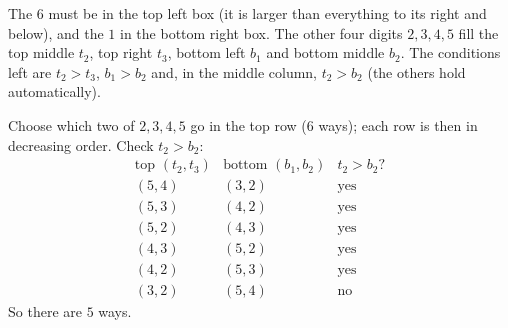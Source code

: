 The $6$ must be in the top left box (it is larger than everything to its right and below), and the $1$ in the bottom right box. The other four digits $2,3,4,5$ fill the top middle $t_2$, top right $t_3$, bottom left $b_1$ and bottom middle $b_2$. The conditions left are $t_2>t_3$, $b_1>b_2$ and, in the middle column, $t_2>b_2$ (the others hold automatically).

Choose which two of $2,3,4,5$ go in the top row ($6$ ways); each row is then in decreasing order. Check $t_2>b_2$:
\[\begin{array}{c|c|c}
\text{top }(t_2,t_3)&\text{bottom }(b_1,b_2)&t_2>b_2?\\\hline
(5,4)&(3,2)&\text{yes}\\
(5,3)&(4,2)&\text{yes}\\
(5,2)&(4,3)&\text{yes}\\
(4,3)&(5,2)&\text{yes}\\
(4,2)&(5,3)&\text{yes}\\
(3,2)&(5,4)&\text{no}
\end{array}\]
So there are $\boxed{5}$ ways.
